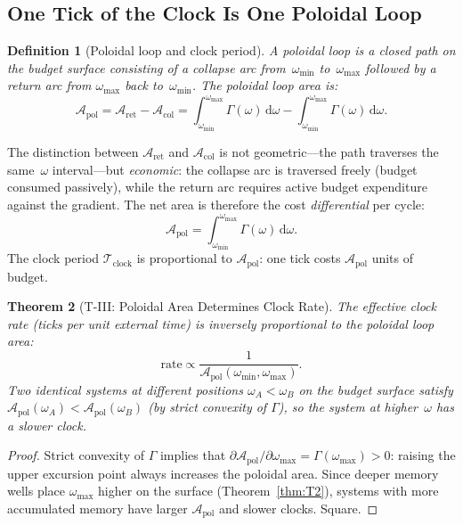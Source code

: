 \documentclass[
  aps,
  prd,
  twocolumn,
  superscriptaddress,
  nofootinbib,
  floatfix
]{revtex4-2}
\newtheorem{theorem}{Theorem}
\newtheorem{definition}[theorem]{Definition}
\newcommand{\Gam}{\Gamma}
\newcommand{\dd}{\mathrm{d}}
\newcommand{\Apol}{\mathcal{A}_{\mathrm{pol}}}         %
\newcommand{\Tclock}{\mathcal{T}_{\mathrm{clock}}}     %
\newcommand{\Aret}{\mathcal{A}_{\mathrm{ret}}}         %
\newcommand{\Acol}{\mathcal{A}_{\mathrm{col}}}         %
\begin{document}
\subsection{One Tick of the Clock Is One Poloidal Loop}

\begin{definition}[Poloidal loop and clock period]
\label{def:poloidalloop}
A \emph{poloidal loop} is a closed path on the budget surface
consisting of a \emph{collapse arc} from~$\omega_{\min}$
to~$\omega_{\max}$ followed by a \emph{return arc} from
$\omega_{\max}$ back to~$\omega_{\min}$.  The
\emph{poloidal loop area} is:
\begin{equation}
  \Apol = \Aret - \Acol
       = \int_{\omega_{\min}}^{\omega_{\max}} \Gam(\omega)\,\dd\omega
         - \int_{\omega_{\min}}^{\omega_{\max}} \Gam(\omega)\,\dd\omega.
  \label{eq:polarea_naive}
\end{equation}
\end{definition}

The distinction between $\Aret$ and $\Acol$ is not
geometric---the path traverses the same~$\omega$ interval---but
\emph{economic}: the collapse arc is traversed freely (budget
consumed passively), while the return arc requires active
budget expenditure against the gradient.  The net area is
therefore the cost \emph{differential} per cycle:
\begin{equation}
  \Apol = \int_{\omega_{\min}}^{\omega_{\max}} \Gam(\omega)\,\dd\omega.
  \label{eq:polarea}
\end{equation}
The clock period $\Tclock$ is proportional to $\Apol$:
one tick costs $\Apol$ units of budget.

\begin{theorem}[T-III: Poloidal Area Determines Clock Rate]
\label{thm:T3}
The effective clock rate (ticks per unit external time)
is inversely proportional to the poloidal loop area:
\begin{equation}
  \text{rate} \propto \frac{1}{\Apol(\omega_{\min}, \omega_{\max})}.
  \label{eq:clockrate}
\end{equation}
Two identical systems at different positions $\omega_{A} <
\omega_{B}$ on the budget surface satisfy
$\Apol(\omega_A) < \Apol(\omega_B)$ (by strict convexity of
$\Gam$), so the system at higher~$\omega$ has a slower clock.
\end{theorem}

\begin{proof}
Strict convexity of $\Gam$ implies that
$\partial \Apol / \partial \omega_{\max} = \Gam(\omega_{\max})
> 0$: raising the upper excursion point always increases
the poloidal area.  Since deeper memory wells place $\omega_{\max}$
higher on the surface (Theorem~\ref{thm:T2}), systems with
more accumulated memory have larger $\Apol$ and slower
clocks.  Square.
\end{proof}
\end{document}
